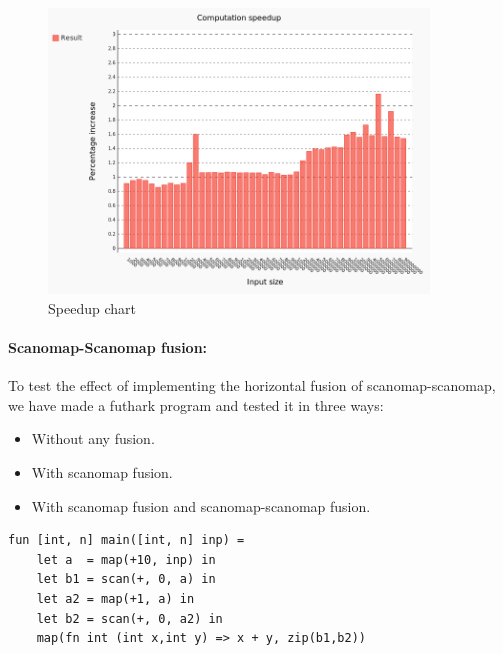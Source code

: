 \documentclass[11pt]{article}
\begin{document}
\begin{figure}[hb]
  \centering
    \includegraphics[width=0.9\textwidth]{images/futhark-c-comparing.png}
  \caption{Speedup chart}
  \label{fig:scanomap-radix}
\end{figure}

\paragraph*{Scanomap-Scanomap fusion:}
To test the effect of implementing the horizontal fusion of scanomap-scanomap, we have made a futhark program and tested it in three ways:

\begin{itemize}
\item Without any fusion.
\item With scanomap fusion.
\item With scanomap fusion and scanomap-scanomap fusion.
\end{itemize}

\begin{lstlisting}[caption=Scanomap-scanomap benchmark program] 
fun [int, n] main([int, n] inp) =
    let a  = map(+10, inp) in
    let b1 = scan(+, 0, a) in
    let a2 = map(+1, a) in
    let b2 = scan(+, 0, a2) in
    map(fn int (int x,int y) => x + y, zip(b1,b2))

\end{lstlisting}
\end{document}
